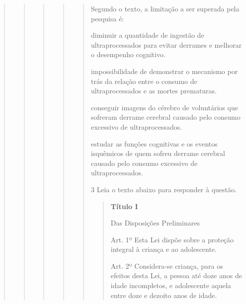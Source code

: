 \begin{quote}
\begin{quote}
\begin{quote}
\begin{quote}
\begin{quote}
Segundo o texto, a limitação a ser superada pela pesquisa é:

\begin{escolha}

    \item diminuir a quantidade de ingestão de ultraprocessados para evitar derrames e melhorar o desempenho cognitivo.

    \item impossibilidade de demonstrar o mecanismo por trás da relação entre o consumo de ultraprocessados e as mortes prematuras.
  
    \item conseguir imagens do cérebro de voluntários que sofreram derrame cerebral causado pelo consumo excessivo de ultraprocessados.
  
    \item estudar as funções cognitivas e os eventos isquêmicos de quem sofreu derrame cerebral causado pelo consumo excessivo de ultraprocessados.

\end{escolha}


\num{3} Leia o texto abaixo para responder à questão. 

\begin{quote}

\textbf{Título I}

Das Disposições Preliminares

Art. 1º Esta Lei dispõe sobre a proteção integral à criança e ao
adolescente.

Art. 2º Considera-se criança, para os efeitos desta Lei, a pessoa até
doze anos de idade incompletos, e adolescente aquela entre doze e
dezoito anos de idade.


\end{quote}
\end{quote}
\end{quote}
\end{quote}
\end{quote}
\end{quote}
